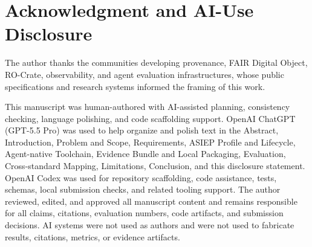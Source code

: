 \section*{Acknowledgment and AI-Use Disclosure}

The author thanks the communities developing provenance, FAIR Digital Object, RO-Crate, observability, and agent evaluation infrastructures, whose public specifications and research systems informed the framing of this work.

This manuscript was human-authored with AI-assisted planning, consistency checking, language polishing, and code scaffolding support. OpenAI ChatGPT (GPT-5.5 Pro) was used to help organize and polish text in the Abstract, Introduction, Problem and Scope, Requirements, ASIEP Profile and Lifecycle, Agent-native Toolchain, Evidence Bundle and Local Packaging, Evaluation, Cross-standard Mapping, Limitations, Conclusion, and this disclosure statement. OpenAI Codex was used for repository scaffolding, code assistance, tests, schemas, local submission checks, and related tooling support. The author reviewed, edited, and approved all manuscript content and remains responsible for all claims, citations, evaluation numbers, code artifacts, and submission decisions. AI systems were not used as authors and were not used to fabricate results, citations, metrics, or evidence artifacts.
